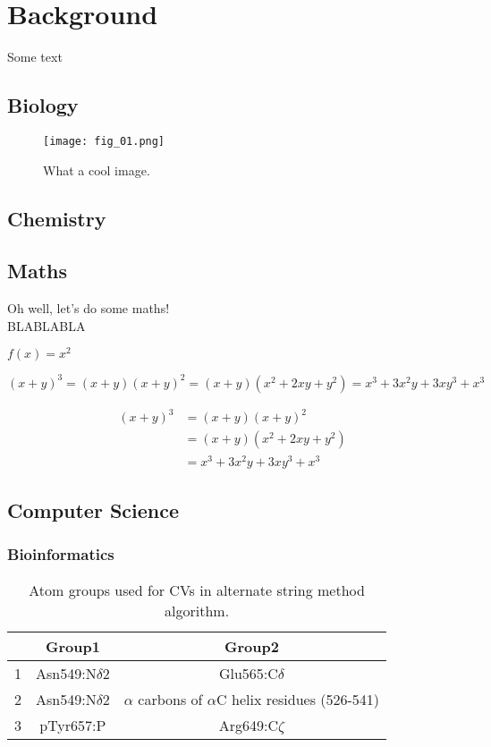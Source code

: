 \chapter{Background}
Some text

\section{Biology}

\begin{figure}[h]
    \centering
    \texttt{[image: fig\_01.png]}
    \caption{What a cool image.}
    \label{fig:f01}
\end{figure}

\newpage
\section{Chemistry}

\newpage
\section{Maths}

Oh well, let's do some maths! \\

BLABLABLA

$f(x)=x^2$

\begin{equation}
		(x+y)^3 = (x+y)(x+y)^2
       		    =(x+y)(x^2+2xy+y^2)
                =x^3+3x^2y+3xy^3+x^3
\end{equation}

\begin{equation}
	\begin{split}
		(x+y)^3&=(x+y)(x+y)^2 \\
       		   &=(x+y)(x^2+2xy+y^2) \\
               &=x^3+3x^2y+3xy^3+x^3
	\end{split}
    \label{useful_name}
\end{equation}

\newpage
\section{Computer Science}

\subsection{Bioinformatics}

\begin{table}[h]
 \caption{Atom groups used for CVs in alternate string method algorithm.}\vspace{0.5cm}
 \centering
	\begin{tabular}{|c| c| c|}
	\hline
	& \textbf{Group1} & \textbf{Group2} \\
	\hline
	1 & Asn549:N$\delta$2 & Glu565:C$\delta$ \\
	\hline
	2 & Asn549:N$\delta$2 & $\alpha$ carbons of $\alpha$C helix residues (526-541) \\
	\hline
	3 & pTyr657:P & Arg649:C$\zeta$ \\
	\hline
	\end{tabular}
\end{table}

